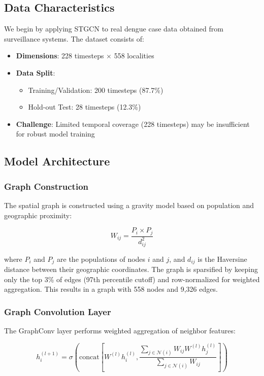 \documentclass[12pt,a4paper]{article}
\begin{document}
\subsection{Data Characteristics}
We begin by applying STGCN to real dengue case data obtained from surveillance systems. The dataset consists of:
\begin{itemize}
    \item \textbf{Dimensions}: 228 timesteps $\times$ 558 localities
    \item \textbf{Data Split}: 
    \begin{itemize}
        \item Training/Validation: 200 timesteps (87.7\%)
        \item Hold-out Test: 28 timesteps (12.3\%)
    \end{itemize}
    \item \textbf{Challenge}: Limited temporal coverage (228 timesteps) may be insufficient for robust model training
\end{itemize}

\subsection{Model Architecture}

\subsubsection{Graph Construction}
The spatial graph is constructed using a gravity model based on population and geographic proximity:

\begin{equation}
W_{ij} = \frac{P_i \times P_j}{d_{ij}^2}
\end{equation}

where $P_i$ and $P_j$ are the populations of nodes $i$ and $j$, and $d_{ij}$ is the Haversine distance between their geographic coordinates. The graph is sparsified by keeping only the top 3\% of edges (97th percentile cutoff) and row-normalized for weighted aggregation. This results in a graph with 558 nodes and 9,326 edges.

\subsubsection{Graph Convolution Layer}
The GraphConv layer performs weighted aggregation of neighbor features:

\begin{equation}
h_i^{(l+1)} = \sigma\left(\text{concat}\left[W^{(l)} h_i^{(l)}, \frac{\sum_{j \in \mathcal{N}(i)} W_{ij} W^{(l)} h_j^{(l)}}{\sum_{j \in \mathcal{N}(i)} W_{ij}}\right]\right)
\end{equation}
\end{document}

